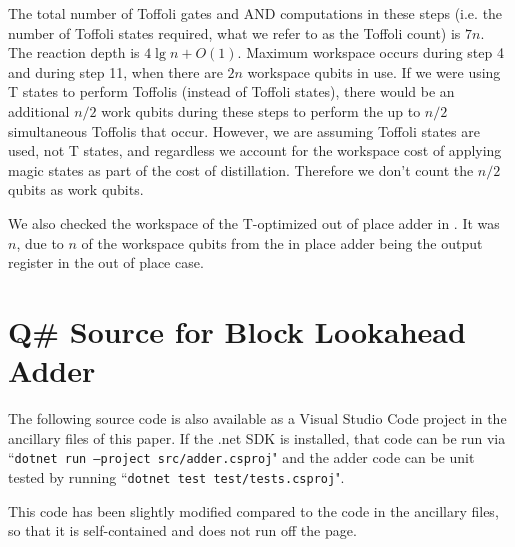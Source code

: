 \documentclass[onecolumn,unpublished]{quantumarticle}
\theoremstyle{definition}
\theoremstyle{definition}
\theoremstyle{definition}
\begin{document}
The total number of Toffoli gates and AND computations in these steps (i.e. the number of Toffoli states required, what we refer to as the Toffoli count) is $7n$.
The reaction depth is $4 \lg n + O(1)$.
Maximum workspace occurs during step 4 and during step 11, when there are $2n$ workspace qubits in use.
If we were using T states to perform Toffolis (instead of Toffoli states), there would be an additional $n/2$ work qubits during these steps to perform the up to $n/2$ simultaneous Toffolis that occur.
However, we are assuming Toffoli states are used, not T states, and regardless we account for the workspace cost of applying magic states as part of the cost of distillation.
Therefore we don't count the $n/2$ qubits as work qubits.

We also checked the workspace of the T-optimized out of place adder in \cite{thapliyal2020lookahead}.
It was $n$, due to $n$ of the workspace qubits from the in place adder being the output register in the out of place case.

\section{Q\# Source for Block Lookahead Adder}
\label{app:blockadder}

The following source code is also available as a Visual Studio Code project in the ancillary files of this paper.
If the .net SDK is installed, that code can be run via ``\texttt{dotnet run --project src/adder.csproj}" and the adder code can be unit tested by running ``\texttt{dotnet test test/tests.csproj}".

This code has been slightly modified compared to the code in the ancillary files, so that it is self-contained and does not run off the page.
\end{document}
